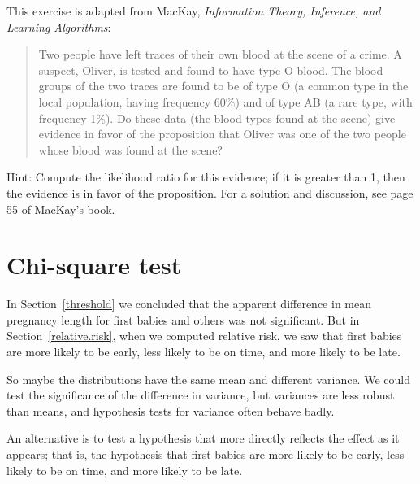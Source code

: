 \documentclass[12pt]{book}
\begin{document}
\begin{ex}


This exercise is adapted from MacKay, {\em Information
  Theory, Inference, and Learning Algorithms}:

\begin{quote}

Two people have left traces of their own blood at the scene of a
crime.  A suspect, Oliver, is tested and found to have type O blood.
The blood groups of the two traces are found to be of type O (a common
type in the local population, having frequency 60\%) and of type AB (a
rare type, with frequency 1\%).  Do these data (the blood types found
at the scene) give evidence in favor of the proposition that
Oliver was one of the two people whose blood was found at the scene?

\end{quote}

Hint: Compute the likelihood ratio for this evidence; if it is greater
than 1, then the evidence is in favor of the proposition.
For a solution and discussion, see page 55 of MacKay's book.


\end{ex}


\section{Chi-square test}

In Section~\ref{threshold} we concluded that the apparent difference
in mean pregnancy length for first babies and others was not
significant.  But in Section~\ref{relative.risk}, when we computed
relative risk, we saw that first babies are more likely to be early,
less likely to be on time, and more likely to be late.



So maybe the distributions have the same mean and different variance.
We could test the significance of the difference in variance, but
variances are less robust than means, and hypothesis tests for
variance often behave badly.


An alternative is to test a hypothesis that more directly reflects the
effect as it appears; that is, the hypothesis that first babies are
more likely to be early, less likely to be on time, and more likely to
be late.
\end{document}
